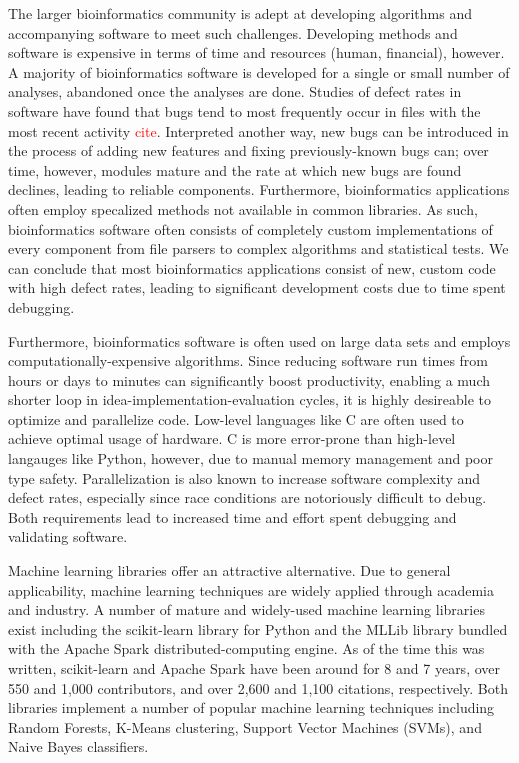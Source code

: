 The larger bioinformatics community is adept at developing algorithms and accompanying software to meet such challenges.  Developing methods and software is expensive in terms of time and resources (human, financial), however. A majority of bioinformatics software is developed for a single or small number of analyses, abandoned once the analyses are done. Studies of defect rates in software have found that bugs tend to most frequently occur in files with the most recent activity \textcolor{red}{cite}.  Interpreted another way, new bugs can be introduced in the process of adding new features and fixing previously-known bugs can; over time, however, modules mature and the rate at which new bugs are found declines, leading to reliable components. Furthermore, bioinformatics applications often employ specalized methods not available in common libraries.  As such, bioinformatics software often consists of completely custom implementations of every component from file parsers to complex algorithms and statistical tests.  We can conclude that most bioinformatics applications consist of new, custom code with high defect rates, leading to significant development costs due to time spent debugging.

Furthermore, bioinformatics software is often used on large data sets and employs computationally-expensive algorithms.  Since reducing software run times from hours or days to minutes can significantly boost productivity, enabling a much shorter loop in idea-implementation-evaluation cycles, it is highly desireable to optimize and parallelize code.  Low-level languages like C are often used to achieve optimal usage of hardware. C is more error-prone than high-level langauges like Python, however, due to manual memory management and poor type safety.  Parallelization is also known to increase software complexity and defect rates, especially since race conditions are notoriously difficult to debug. Both requirements lead to increased time and effort spent debugging and validating software.

Machine learning libraries offer an attractive alternative.  Due to general applicability, machine learning techniques are widely applied through academia and industry.  A number of mature and widely-used machine learning libraries exist including the scikit-learn \cite{scikit-learn} library for Python and the MLLib library bundled with the Apache Spark distributed-computing engine.  As of the time this was written, scikit-learn and Apache Spark have been around for 8 and 7 years, over 550 and 1,000 contributors, and over 2,600 and 1,100 citations, respectively. Both libraries implement a number of popular machine learning techniques including Random Forests, K-Means clustering, Support Vector Machines (SVMs), and Naive Bayes classifiers. 

